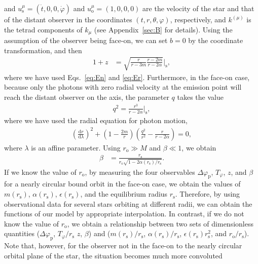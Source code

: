 \documentclass[aps,11pt,nofootinbib,preprintnumbers,groupedaddress,superscriptaddress]{revtex4-2}
\begin{document}
and
$u^{\mu}_{\mathrm{s}}=(\dot{t},0,0,\dot{\varphi})$ and $u_{\mathrm{o}}^\mu=(1,0,0,0)$ are the velocity of the 
star and that of the distant observer in the coordinates $(t,r,\theta,\varphi)$, respectively, and $k^{(\mu)}$ is the tetrad components of $k_\mu$ (see Appendix~\ref{sec:B} for details).
Using the assumption of the observer being face-on, we can set $b=0$ by the coordinate transformation, and then 
\begin{align}
\label{eq:zobs}
1+z
&
=\sqrt{\frac{r}{r-3m} \frac{r-2m}{r-2\alpha}}\bigg|_{\mathrm{s}},
\end{align}
where we have used Eqs.~\eqref{eq:En} and \eqref{eq:Er}.
Furthermore, in the face-on case, because only the photons with zero radial velocity at the emission point will reach the distant observer on the axis, the parameter $q$ takes the value 
\begin{align}
\label{eq:qsour}
q^2
=\frac{r^3}{r-2\alpha}\bigg|_{\mathrm{s}},
\end{align}
where we have used the radial equation for photon motion, 
\begin{align}
\left(\frac{\mathrm{d}r}{\mathrm{d}\lambda}\right)^2+\left(1-\frac{2m}{r}\right)\left(\frac{q^2}{r^2}-\frac{r}{r-2\alpha}\right)=0,
\end{align}
where $\lambda$ is an affine parameter. Using $r_{\mathrm{o}}\gg M$ and $\beta\ll 1$, 
we obtain 
\begin{align}
\beta&= 
\frac{r_{\mathrm{s}}}{r_{\mathrm{o}}\sqrt{
1-2\alpha(r_{\mathrm{s}})/r_{\mathrm{s}}}}. 
\end{align}
If we know the value of $r_{\mathrm{o}}$, by measuring the four observables $\Delta \varphi_{\mathrm{p}}$, $T_\varphi$, $z$, and $\beta$ for a nearly circular bound orbit in the face-on case, we obtain the values of $m(r_{\mathrm{s}})$, $\alpha(r_{\mathrm{s}})$, $\epsilon(r_{\mathrm{s}})$, and the equilibrium radius $r_{\mathrm{s}}$.
Therefore, by using observational data for several stars orbiting at different radii, 
we can 
obtain
the functions of our model 
by appropriate interpolation.
In contrast, if we do not know the value of $r_{\mathrm{o}}$, we obtain a relationship between two sets of dimensionless quantities
($\Delta \varphi_{\mathrm{p}}$, $T_{\varphi}/r_{\mathrm{s}}$ $z$, $\beta$) and ($m(r_{\mathrm{s}})/r_{\mathrm{s}}$, $\alpha(r_{\mathrm{s}})/r_{\mathrm{s}}$, $\epsilon(r_{\mathrm{s}}) r_{\mathrm{s}}^2$, and $r_{\mathrm{o}}/r_{\mathrm{s}}$).
Note that, however, 
for the observer not in the face-on to the nearly circular orbital plane of the 
star,
the situation becomes much more convoluted
\end{document}
